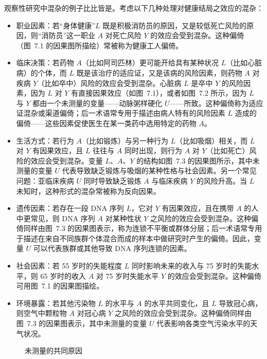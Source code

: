 观察性研究中混杂的例子比比皆是。考虑以下几种处理对健康结局之效应的混杂：

\begin{itemize}
\item 职业因素：若“身体健康”$L$ 既是积极消防员的原因，又是较低死亡风险的原因，则“消防员”这一职业 $A$ 对死亡风险 $Y$ 的效应会受到混杂。这种偏倚（图~7.1 的因果图所描绘）常被称为健康工人偏倚。
\item 临床决策：若药物 $A$（比如阿司匹林）更可能开给具有某种状况 $L$（比如心脏病）的个体，而 $L$ 既是该治疗的适应证，又是该病的风险因素，则药物 $A$ 对疾病 $Y$（比如卒中）风险的效应会受到混杂。心脏病 $L$ 是卒中 $Y$ 的风险因素，因为 $L$ 对 $Y$ 有直接因果效应（如图~7.1），或者如图~7.2 所示，因为 $L$ 与 $Y$ 都由一个未测量的变量——动脉粥样硬化 $U$——所致。这种偏倚称为适应证混杂或渠道偏倚；后一术语常专用于描述由病人特有的风险因素 $L$ 造成的偏倚——这些因素促使医生在某一类药中选用特定的药物 $A$。
\item 生活方式：若行为 $A$（比如锻炼）与另一种行为 $L$（比如吸烟）相关，而 $L$ 对 $Y$ 有因果效应，且 $L$ 往往与 $A$ 同时出现，则行为 $A$ 对 $Y$（比如死亡）风险的效应会受到混杂。变量 $L$、$A$、$Y$ 的结构如图~7.3 的因果图所示，其中未测量的变量 $U$ 代表导致缺乏锻炼与吸烟的某种性格与社会因素。另一个常见问题：亚临床疾病 $U$ 同时导致缺乏锻炼 $A$ 与临床疾病 $Y$ 的风险升高。当 $L$ 未知时，这种形式的混杂常被称为反向因果。
\item 遗传因素：若存在一段 DNA 序列 $L$，它对 $Y$ 有因果效应，且在携带 $A$ 的人中更常见，则 DNA 序列 $A$ 对某种性状 $Y$ 之风险的效应会受到混杂。这种偏倚同样由图~7.3 的因果图表示，称为连锁不平衡或群体分层；后一术语常专用于描述在来自不同族群个体混合而成的样本中做研究时产生的偏倚。因此，变量 $U$ 可以代表族群或其他导致 DNA 序列连锁的因素。
\item 社会因素：若 55 岁时的失能程度 $L$ 同时影响未来的收入与 75 岁时的失能水平，则 65 岁时的收入 $A$ 对 75 岁时失能水平 $Y$ 的效应会受到混杂。这种偏倚可用图~7.1 的因果图描绘。
\item 环境暴露：若其他污染物 $L$ 的水平与 $A$ 的水平共同变化，且 $L$ 导致冠心病，则空气中颗粒物 $A$ 对冠心病 $Y$ 之风险的效应会受到混杂。这种偏倚同样由图~7.3 的因果图表示，其中未测量的变量 $U$ 代表影响各类空气污染水平的天气状况。
\end{itemize}

\begin{figure}[htbp]
\centering
{}
\caption{未测量的共同原因}
\label{fig:7.2}
\end{figure}

